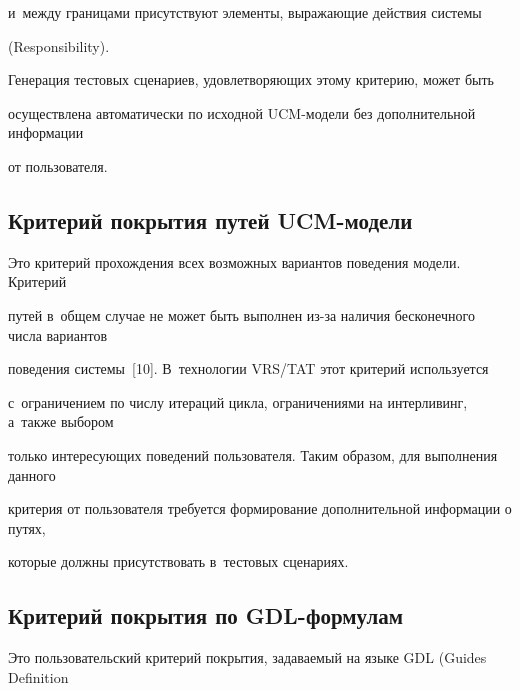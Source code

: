 и~между границами присутствуют элементы, выражающие действия системы

(Responsibility).



  Генерация тестовых сценариев, удовлетворяющих этому критерию, может быть

осуществлена автоматически по исходной UCM-мо\-де\-ли без дополнительной информации

от пользователя.



\vspace*{-3pt}



\subsection{Критерий покрытия путей UCM-модели}



\vspace*{-2pt}



  Это критерий прохождения всех возможных вариантов поведения модели. Критерий

путей в~общем случае не может быть выполнен из-за наличия бесконечного числа вариантов

поведения системы~[10]. В~технологии VRS/TAT этот критерий используется

с~ограничением по числу итераций цикла, ограничениями на интерливинг, а~также выбором

только интересующих поведений пользователя. Таким образом, для выполнения данного

критерия от пользователя требуется формирование дополнительной информации о путях,

которые должны присутствовать в~тестовых сценариях.



\vspace*{-3pt}



\subsection{Критерий покрытия по GDL-формулам}



\vspace*{-2pt}



  Это пользовательский критерий покрытия, задаваемый на языке GDL (Guides Definition

